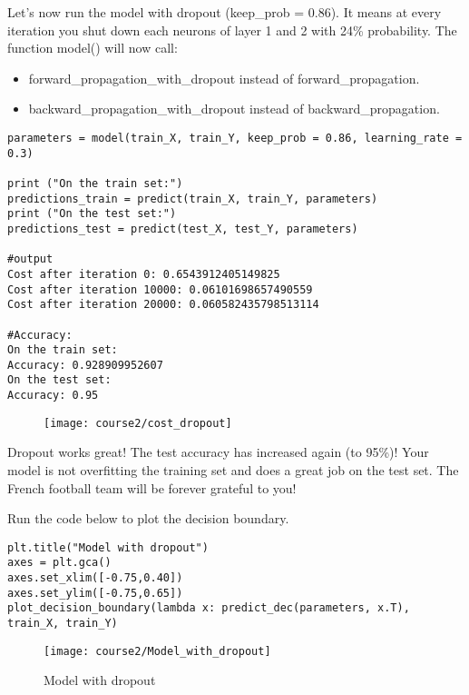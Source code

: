 Let's now run the model with dropout (keep\_prob = 0.86). It means at every iteration you shut down each neurons of layer 1 and 2 with 24\% probability. The function model() will now call:
\begin{itemize}
\item forward\_propagation\_with\_dropout instead of forward\_propagation.
\item backward\_propagation\_with\_dropout instead of backward\_propagation.
\end{itemize}

\begin{verbatim}
parameters = model(train_X, train_Y, keep_prob = 0.86, learning_rate = 0.3)

print ("On the train set:")
predictions_train = predict(train_X, train_Y, parameters)
print ("On the test set:")
predictions_test = predict(test_X, test_Y, parameters)

#output
Cost after iteration 0: 0.6543912405149825
Cost after iteration 10000: 0.06101698657490559
Cost after iteration 20000: 0.060582435798513114

#Accuracy:
On the train set:
Accuracy: 0.928909952607
On the test set:
Accuracy: 0.95
\end{verbatim}
\clearpage

\begin{figure}[h]
\begin{center}
\texttt{[image: course2/cost\_dropout]}
\end{center}
\end{figure}


Dropout works great! The test accuracy has increased again (to 95\%)! Your model is not overfitting the training set and does a great job on the test set. The French football team will be forever grateful to you!

Run the code below to plot the decision boundary.
\begin{verbatim}
plt.title("Model with dropout")
axes = plt.gca()
axes.set_xlim([-0.75,0.40])
axes.set_ylim([-0.75,0.65])
plot_decision_boundary(lambda x: predict_dec(parameters, x.T), train_X, train_Y)
\end{verbatim}

\begin{figure}[h]
\begin{center}
\texttt{[image: course2/Model\_with\_dropout]}
\caption{Model with dropout}
\end{center}
\end{figure}

